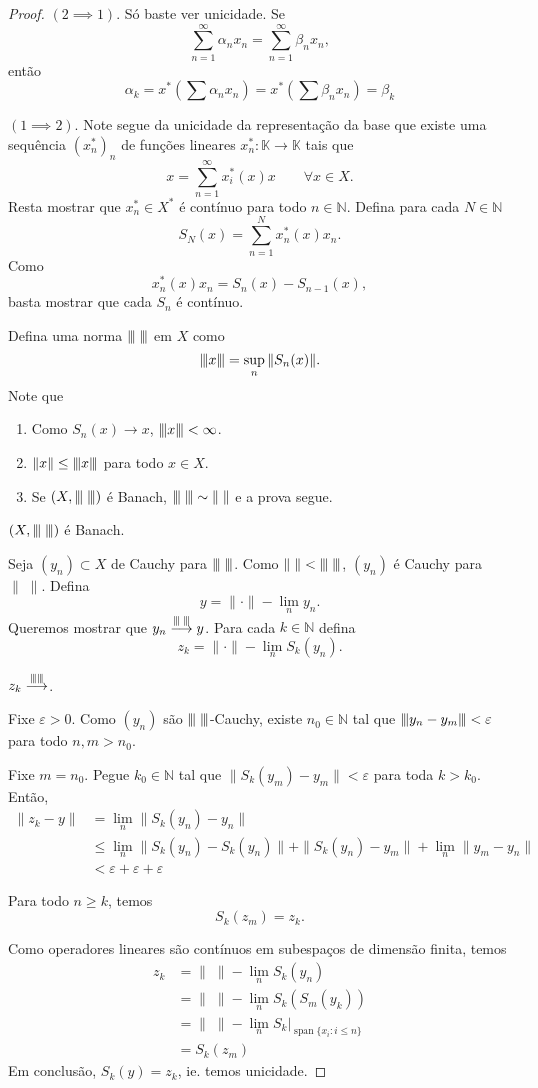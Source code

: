 \documentclass[portuguese]{article}
\theoremstyle{definition}
\newcommand{\N}{\mathbb{N}}
\newcommand{\vertiii}[1]{{\left\vert\kern-0.25ex\left\vert\kern-0.25ex\left\vert #1 
		\right\vert\kern-0.25ex\right\vert\kern-0.25ex\right\vert}}
\begin{document}
\begin{proof}
	$(2\implies 1)$. Só baste ver unicidade. Se
	\[\sum_{n=1}^\infty\alpha_nx_n=\sum_{n=1}^\infty\beta_nx_n,\]
	então
	\[\alpha_k=x^*\left(\sum\alpha_nx_n\right)=x^*\left(\sum\beta_nx_n\right)=\beta_k\]
	
	$(1\implies 2)$. Note segue da unicidade da representação da base que existe uma sequência $(x^*_n)_n$ de funções lineares $x^*_n:\mathbb{K}\to\mathbb{K}$ tais que
	\[x=\sum_{n=1}^\infty x^*_i(x)x\qquad\forall x\in X.\]
	Resta mostrar que $x^*_n\in X^*$ é contínuo para todo $n\in \N$. Defina para cada $N\in\N$
	\[S_N(x)=\sum_{n=1}^Nx^*_n(x)x_n.\]
	Como
	\[x_n^*(x)x_n=S_n(x)-S_{n-1}(x),\]
	basta mostrar que cada $S_n$ é contínuo.
	
	Defina uma norma $\vertiii{\;}$ em $X$ como
	\[\vertiii{x}=\sup_n\|S_n(x)\|.\]
	Note que
	\begin{enumerate}
		\item Como $S_n(x)\to x$, $\vertiii{x}<\infty$.
		\item $\|x\|\leq\vertiii{x}$ para todo $x\in X$.
		\item Se $(X,\vertiii{\;})$ é Banach, $\vertiii{\;}\sim\|\;\|$ e a prova segue.
	\end{enumerate}
	\begin{af*}
		$(X,\vertiii{\;})$ é Banach.
	\end{af*}
	Seja $(y_n)\subset X$ de Cauchy para $\vertiii{\;}$. Como $\|\;\|<\vertiii{\;}$, $(y_n)$ é Cauchy para $\|\;\|$. Defina
	\[y=\|\cdot\|-\lim_ny_n.\]
	Queremos mostrar que $y_n\overset{\vertiii{\;}}{\longrightarrow}y$. Para cada $k\in\N$ defina
	\[z_k=\|\cdot\|-\lim_nS_k(y_n).\]
	\begin{af*}
		$z_k\overset{\vertiii{}}{\longrightarrow}$.
	\end{af*}
	Fixe $\varepsilon>0$. Como $(y_n)$ são $\vertiii{\;}$-Cauchy, existe $n_0\in \N$ tal que $\vertiii{y_n-y_m}<\varepsilon$ para todo $n,m>n_0$.
	
	Fixe $m=n_0$. Pegue $k_0\in\N$ tal que $\|S_k(y_m)-y_m\|<\varepsilon$ para toda $k>k_0$. Então,
	\begin{align*}
		\|z_k-y\|&=\lim_n\|S_k(y_n)-y_n\|\\
		&\leq\lim_n\|S_k(y_n)-S_k(y_n)\|+\|S_k(y_n)-y_m\|+\lim_n\|y_m-y_n\|\\
		&<\varepsilon+\varepsilon+\varepsilon
	\end{align*}
	\begin{af*}
		Para todo $n\geq k$, temos
		\[S_k(z_m)=z_k.\]
	\end{af*}
	Como operadores lineares são contínuos em subespaços de dimensão finita, temos
	\begin{align*}
		z_k&=\|\;\|-\lim_nS_k(y_n)\\
		&=\|\;\|-\lim_nS_k(S_m(y_k))\\
		&=\|\;\|-\lim_nS_k|_{\operatorname{span}\{x_i:i\leq n\}}\\
		&=S_k(z_m)
	\end{align*}
	Em conclusão, $S_k(y)=z_k$, ie. temos unicidade.
	

\end{proof}
\end{document}
